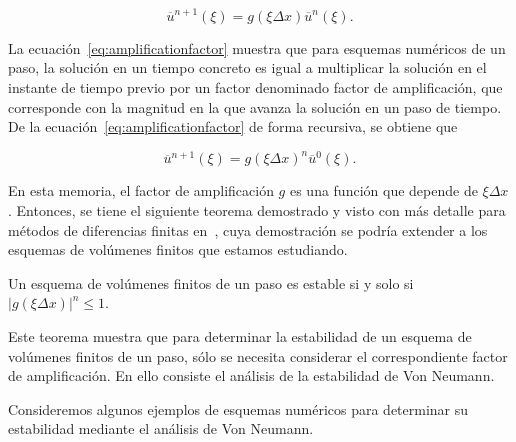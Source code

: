 \begin{equation}\label{eq:amplificationfactor}
  \overline{u}^{n+1}
  \left(\xi\right)=
  g
  \left(\xi\Delta x\right)
  \overline{u}^{n}
  \left(\xi\right).
\end{equation}

La ecuación~\eqref{eq:amplificationfactor} muestra que para esquemas
numéricos de un paso, la solución en un tiempo concreto es igual a
multiplicar la solución en el instante de tiempo previo por un factor
denominado factor de amplificación, que corresponde con la magnitud
en la que avanza la solución en un paso de tiempo.
De la ecuación~\eqref{eq:amplificationfactor} de forma recursiva, se
obtiene que

\begin{equation*}
  \overline{u}^{n+1}
  \left(\xi\right)=
  {g\left(\xi\Delta x\right)}^{n}
  \overline{u}^{0}
  \left(\xi\right).
\end{equation*}

En esta memoria, el factor de amplificación $g$ es una función que
depende de $\xi\Delta x$.
Entonces, se tiene el siguiente teorema demostrado y visto con más
detalle para métodos de diferencias finitas en~\cite{Strikwerda2004},
cuya demostración se podría extender a los esquemas de volúmenes
finitos que estamos estudiando.

\begin{theorem}
  Un esquema de volúmenes finitos de un paso es estable si y solo si
  \begin{math}
    {\left|
    {g\left(\xi\Delta x\right)}
    \right|}^{n}\leq
    1
  \end{math}.
\end{theorem}

Este teorema muestra que para determinar la estabilidad de un esquema
de volúmenes finitos de un paso, sólo se necesita considerar el
correspondiente factor de amplificación.
En ello consiste el análisis de la estabilidad de Von Neumann.

Consideremos algunos ejemplos de esquemas numéricos para determinar
su estabilidad mediante el análisis de Von Neumann.

